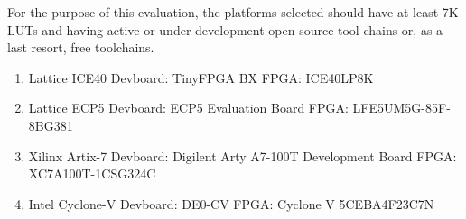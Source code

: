 For the purpose of this evaluation, the platforms selected should have at least 7K LUTs and having active or under development open-source tool-chains or, as a last resort,  free toolchains.
\begin{enumerate}
    \item {Lattice ICE40}
    \newline Devboard: TinyFPGA BX
    \newline FPGA: ICE40LP8K
    \item Lattice ECP5
    \newline Devboard: ECP5 Evaluation Board
    \newline FPGA: LFE5UM5G-85F-8BG381
    \item Xilinx Artix-7
    \newline Devboard: Digilent Arty A7-100T Development Board
    \newline FPGA: XC7A100T-1CSG324C
    \item Intel Cyclone-V
    \newline Devboard: DE0-CV
    \newline FPGA: Cyclone V 5CEBA4F23C7N 

\end{enumerate}